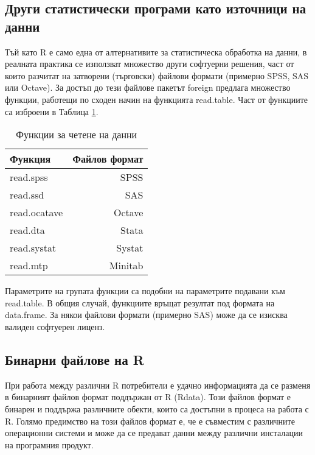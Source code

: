 \subsection{Други статистически програми като източници на данни}

Тъй като R е само една от алтернативите за статистическа обработка на данни, в реалната практика се използват множество други софтуерни решения, част от които разчитат на затворени (търговски) файлови формати (примерно SPSS, SAS или Octave). За достъп до тези файлове пакетът foreign предлага множество функции, работещи по сходен начин на функцията read.table. Част от функциите са изброени в Таблица \ref{table0001}. 

\begin{table}[h!]
\centering
\begin{tabular}{|l|r|} 
 \rowcolor{lightgray}
 \hline
 Функция & Файлов формат \\ [0.1ex] 
 \hline\hline
 read.spss & SPSS \\
 \hline
 read.ssd & SAS \\
 \hline
 read.ocatave & Octave \\
 \hline
 read.dta & Stata \\
 \hline
 read.systat & Systat \\
 \hline
 read.mtp & Minitab \\
 \hline
\end{tabular}
\caption{Функции за четене на данни}
\label{table0001}
\end{table}

Параметрите на групата функции са подобни на параметрите подавани към read.table. В общия случай, функциите връщат резултат под формата на data.frame. За някои файлови формати (примерно SAS) може да се изисква валиден софтуерен лиценз. 

\subsection{Бинарни файлове на R}

При работа между различни R потребители е удачно информацията да се разменя в бинарният файлов формат поддържан от R (Rdata). Този файлов формат е бинарен и поддържа различните обекти, които са достъпни в процеса на работа с R. Голямо предимство на този файлов формат е, че е съвместим с различните операционни системи и може да се предават данни между различни инсталации на програмния продукт. 

